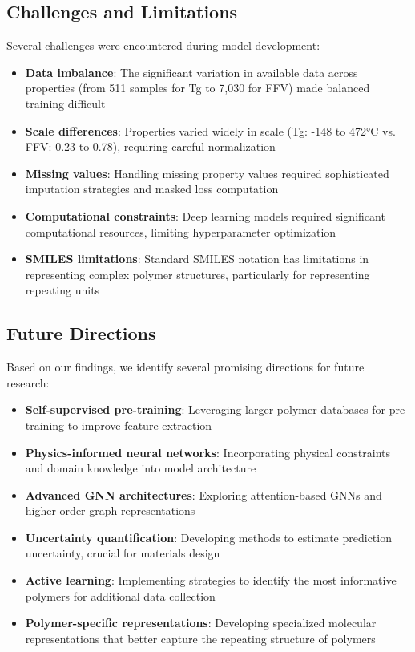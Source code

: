 \documentclass[10pt,twocolumn,letterpaper]{article}
\begin{document}
\subsection{Challenges and Limitations}

Several challenges were encountered during model development:
\begin{itemize}
    \item \textbf{Data imbalance}: The significant variation in available data across properties (from 511 samples for Tg to 7,030 for FFV) made balanced training difficult
    \item \textbf{Scale differences}: Properties varied widely in scale (Tg: -148 to 472°C vs. FFV: 0.23 to 0.78), requiring careful normalization
    \item \textbf{Missing values}: Handling missing property values required sophisticated imputation strategies and masked loss computation
    \item \textbf{Computational constraints}: Deep learning models required significant computational resources, limiting hyperparameter optimization
    \item \textbf{SMILES limitations}: Standard SMILES notation has limitations in representing complex polymer structures, particularly for representing repeating units
\end{itemize}

\subsection{Future Directions}

Based on our findings, we identify several promising directions for future research:
\begin{itemize}
    \item \textbf{Self-supervised pre-training}: Leveraging larger polymer databases for pre-training to improve feature extraction
    \item \textbf{Physics-informed neural networks}: Incorporating physical constraints and domain knowledge into model architecture
    \item \textbf{Advanced GNN architectures}: Exploring attention-based GNNs and higher-order graph representations
    \item \textbf{Uncertainty quantification}: Developing methods to estimate prediction uncertainty, crucial for materials design
    \item \textbf{Active learning}: Implementing strategies to identify the most informative polymers for additional data collection
    \item \textbf{Polymer-specific representations}: Developing specialized molecular representations that better capture the repeating structure of polymers
\end{itemize}
\end{document}
